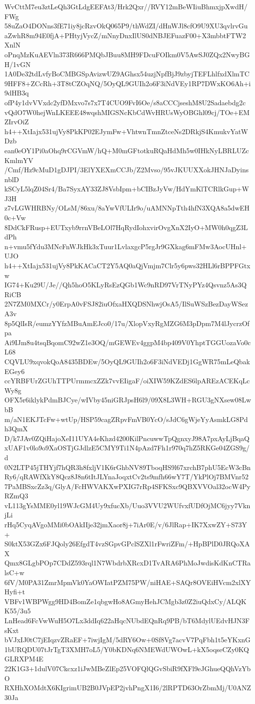 WvCttM7eu3ztLeQh3GtLdgEEFAt3/Hrk2Qxr//RVY12mBeWIiuBhmxjpXwdH/FWg
58uZaO4DONns3fE71iy8jcRzvOkQ065P9/thWdZI/dHnWJl8cfO9U9XU3qvlrvGu
aZwhR8m94E0fjA+PHtyjVycZ/mNnyDnxIlUS0dNBJEFuazF00+X3mbbtFTW2XnlN
oPnqMzKuAEVln373R666PMQbJBuu8MH9FDcuFOIkm0V5AwSJ0ZQx2NwyBGH/1vGN
1A0De32tdLvfyBoCMBGSpAvizwUZ9AGhsx54uzjNpfBjJ9zbyjTEFLhlfxdXlmTC
9HFF8+ZCcRh+3T8tCZOqNQ/5OyQL9GUIh2o6F3iNdVEy1RP7DWxKO6Ah+i9dHB3q
ofP4y1dvVVxdc2yfDMxvo7s7x7T4CUO9FvI6Oe/s8aCCCjseshM8U2Sadaebdg2c
vQdO7W0hejWnLKEEE48wqshMIGSNcKbCdWvHRUsWyOBGhl09cj/TOe+EMZIrvOiZ
h4++XtIajx531ujVy8PkKP02EJymFw+VhtwnTmnZtceNs2DRkjS4KmukvYatWDzb
ean0eOY1Pi0aOhq9rCGVmW/hQ+M0mGFtotkuRQaHdMh5w0IHkNyLBRLUZcKmlmYV
/Cmf/Hz9cMuD1gDJPI/3ElYXEXmCCJb/Z2Mvso/95vJKUUXXokJHNJaDyinsnblD
kSCyL5lqZ04Sr4/Ba7SyxAY33ZJ8VsbIpm+bCIBzJyVw/HdYmKlTCRlkGup+WJ3H
z7vLGWHRBNy/OLsM/86xu/8aYwVfULIr9o/uAMNNpTth4hfN3XQA8a5dwEH0c+Vw
8DdCkFRusp+EUTxyb9rrnVBeLOl7HqRydIohxvirOvgXnX2IyO+MW0h0qgZ3LdPh
n+vmu5fYdu3MNcFnWJkHk3xTuur1LvlaxgcP5rgJr9GXkag6mFMw3AocUHnl+UJO
h4++XtIajx531ujVy8PkKACaCT2Y5AQ0aQjVmjm7Clr5y6pws32HLl6rBPPFGtxw
IG74+Ku29U/Je//Qh5hoO5KLyRsEzQGb1Wc9nRD97VrTNyPYz4Qsvnz5As3QRiCB
2N7ZM0MXCr/y0ErpA0vFSJ82iuOfxaHXQDSNhwjOsA5/IlSuWSzBezDayWSezA3v
8p5QlIsR/eumzYYfzMBuAmEJco0/17u/XlopVxyRgMZG6M3pDpm7M4lJycrzOfpa
Ai9IJm8u4tsqBqomC92wZ1e3OQ/mGEWEv4ggpM4bp409V0YhptTGGUozaVo0cL68
CQVLU9xqvokQoA8435BDEw/5OyQL9GUIh2o6F3iNdVEDj1GgWR75mLeQbakEGey6
ccYRBFUrZGUhTTPUrmmcxZZk7vvEIigaF/oiXIW59KZdES6lpAREzACEKqLcWy8g
OFX5r6iklykPdmBJCye/wIVby45niGRJpsH6l9/09X8L3WH+RGU3gNXsew08LwbB
m/aN1EKJTcFw+wtUp/HSP59cagZRpvFmVB0YcO/sJdC6gWjeYyAsmkLG8Pdh3QmX
D/k7JAv0ZQiHajoXeI11UYA4eKhzd4200KilPncuwwTpQgnxyJ98A7pxAyLjBqaQ
xUAF1v0lo9o9XaOSTjGJdlzE5CMY9Ti1N4pAzd7Fh1r970q7hZ5RKGe04ZGS9g/d
0N2LTP45jTHYjf7hQR3h8fxljV1K6rGhbNV89TboqHS9l67xrchB7phU5EcW3cBn
Ry6/qRAWfXkY8Qcz8J8n6tItJLYnaJoqxtCv2ts9mfh66wY7T/YkPlOj7BMVnr52
7PaMBSxcZz3q/GlyA/FcHWVAKXwPXIG7rRp4SFKSxc9QBXVVOal32ocW4PyRZmQ3
vL113gYsMME0yl19WJcGM4Uy9xfucXb/Uuo3VVU2WUfvxfUDfOjMC6jyy7VknjLi
rHq5CyqAVgoMMi0bOAkIIje32jmXaor8j+7iAr0E/v/6JlRap+IK7XxwZY+S73Y+
S0ktX53GZx6FJQoly26EfgdT4vzSGpvGPclSZXl1rFwriZFm/+HpBPlD0JRQoXAX
Qmx8GLgbPOp7CDdZ593rql1N7WbdrbXRcxD1TvARA6PhMoJwdisKdKnCTRalsC+w
6fV/M0PA31ZmrMpmVk0YaOWIatPZM75PW/niHAE+SAQr8OVEiHVcm2xlXYHyfi+t
VBFv1WBPWgg9HD4BomZe1qbgwHo8AGmyHehJCMgb3z0Z2iuQdxCy/ALQKK55/3u5
LnHead6FcVwWuH5O7Lx3ddIq622aHqcNUbdEQnRq9PB/bT6MdylUEdvHJN3FsKxt
bVJxIJ0tC7jEIqzvZRaEF+7iwjIgM/5dRY6Ow+0Sf8Vg7acvV7PqFbh1t5eYKxnG
1bURQDU07tJrTgT3XMH7oL5/Y0bKDNq6NMEWdUWOwL+kX5oqseCZy0KQGLRXPM4E
22K1G3+1dulV07Ckcxz1iJwMBeZlEp25VOFQlQGvSbiR9fXFl9eJGhueQQhVzYbO
RXHhXOMdtX6KIgrimUB2B0JVpEP2jvhPngX1I6/2lRPTD63OrZbmMj/U0ANZ30Ja
